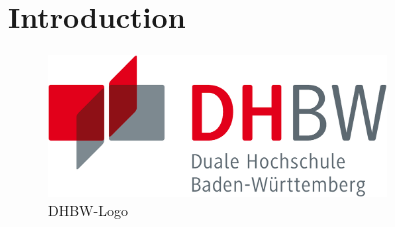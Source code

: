 
\chapter{Introduction}

\begin{figure}[h]
  \centering
  \includegraphics[width=0.8\textwidth]{img/DHBW-Logo}
  \caption{DHBW-Logo \parencite{lin1973}}
  \label{fig:dhbw-logo}
\end{figure}